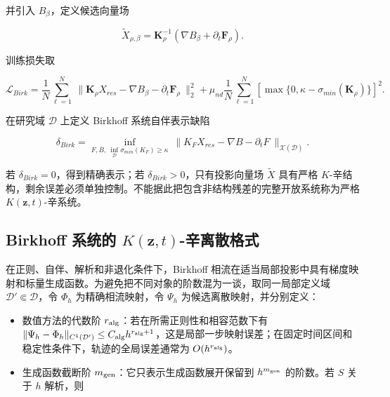 并引入 \(B_{\beta}\)，定义候选向量场

\begin{equation}
\label{eq:symplectic-kam-5-11}
{\widetilde{X}}_{\rho,\beta} = \mathbf{K}_{\rho}^{- 1}\left( \nabla B_{\beta} + \partial_{t}\mathbf{F}_{\rho} \right).
\end{equation}

训练损失取

\begin{equation}
\label{eq:symplectic-kam-5-12}
\mathcal{L}_{Birk} = \frac{1}{N}\sum_{\ell = 1}^{N}\left. \  \parallel \mathbf{K}_{\rho}X_{res} - \nabla B_{\beta} - \partial_{t}\mathbf{F}_{\rho} \right.\  \parallel_{2}^{2} + \mu_{nd}\frac{1}{N}\sum_{\ell = 1}^{N}\left\lbrack \max\{ 0,\kappa - \sigma_{min}\left( \mathbf{K}_{\rho} \right)\} \right\rbrack^{2}.
\end{equation}

在研究域 \(\mathcal{D}\) 上定义 Birkhoff 系统自伴表示缺陷

\begin{equation}
\label{eq:symplectic-kam-5-13}
\boxed{\delta_{Birk} = \inf_{F,B,\ \inf_{\mathcal{D}}\sigma_{min}\left( K_{F} \right) \geq \kappa}\left. \  \parallel K_{F}X_{res} - \nabla B - \partial_{t}F \right.\  \parallel_{\mathcal{X}\left( \mathcal{D} \right)}.}
\end{equation}

若 \(\delta_{Birk} = 0\)，得到精确表示；若 \(\delta_{Birk} > 0\)，只有投影向量场 \(\widetilde{X}\) 具有严格 \(K\)-辛结构，剩余误差必须单独控制。不能据此把包含非结构残差的完整开放系统称为严格 \(K\left( \mathbf{z},t \right)\)-辛系统。

\subsection{\texorpdfstring{Birkhoff 系统的 \(K\left( \mathbf{z},t \right)\)-辛离散格式}{Birkhoff 系统的 K\textbackslash left( \textbackslash mathbf\{z\},t \textbackslash right)-辛离散格式}}\label{sec:symplectic-kam-5-5}

在正则、自伴、解析和非退化条件下，Birkhoff 相流在适当局部投影中具有梯度映射和标量生成函数。为避免把不同对象的阶数混为一谈，取同一局部定义域 \(\mathcal{D}'\Subset\mathcal{D}\)，令 \(\Phi_h\) 为精确相流映射，令 \(\Psi_h\) 为候选离散映射，并分别定义：

\begin{itemize}
\tightlist
\item
  数值方法的代数阶 \(r_{\rm alg}\)：若在所需正则性和相容范数下有 \(\|\Psi_h-\Phi_h\|_{C^{1}(\mathcal{D}')}\leq C_{\rm alg}h^{r_{\rm alg}+1}\)，这是局部一步映射误差；在固定时间区间和稳定性条件下，轨迹的全局误差通常为 \(O(h^{r_{\rm alg}})\)。
\item
  生成函数截断阶 \(m_{\rm gen}\)：它只表示生成函数展开保留到 \(h^{m_{\rm gen}}\) 的阶数。若 \(S\) 关于 \(h\) 解析，则
\end{itemize}

